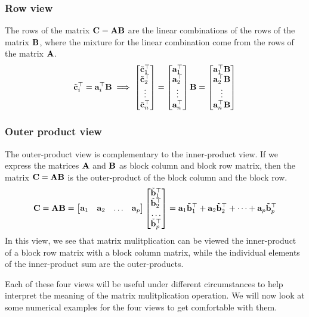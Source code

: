 \subsubsection{Row view}
The rows of the matrix $\mathbf{C} = \mathbf{A}\mathbf{B}$ are the linear combinations of the rows of the matrix $\mathbf{B}$, where the mixture for the linear combination come from the rows of the matrix $\mathbf{A}$.
\begin{equation}
    \tilde{\mf{c}}_i^\top = \mf{a}_i^\top\mf{B} \implies \bmxc \tilde{\mf{c}}_1^\top \\ \tilde{\mf{c}}_2^\top \\ \vdots \\ \tilde{\mf{c}}_n^\top \emx = \bmxc \mf{a}_1^\top \\ \mf{a}_2^\top \\ \vdots \\ \mf{a}_n^\top \emx \mf{B} = \bmxc \mf{a}_1^\top\mf{B} \\ \mf{a}_2^\top\mf{B} \\ \vdots \\ \mf{a}_n^\top\mf{B} \emx
    \label{eq:ch02-mat-mult-row-view}
\end{equation}

\subsubsection{Outer product view}
The outer-product view is complementary to the inner-product view. If we express the matrices $\mathbf{A}$ and $\mathbf{B}$ as block column and block row matrix, then the matrix $\mathbf{C} = \mathbf{A}\mathbf{B}$ is the outer-product of the block column and the block row.
\begin{equation}
    \mf{C} = \mf{A}\mf{B} = \bmxc \mf{a}_1 & \mf{a}_2 & \ldots & \mf{a}_p \emx \bmxc \tilde{\mf{b}}_1^\top \\ \tilde{\mf{b}}_2^\top \\ \ldots \\ \tilde{\mf{b}}_p^\top \emx = \mf{a}_1\tilde{\mf{b}}_1^\top + \mf{a}_2\tilde{\mf{b}}_2^\top + \cdots + \mf{a}_p\tilde{\mf{b}}_p^\top
    \label{eq:ch02-mat-mult-outer-prod}
\end{equation}
In this view, we see that matrix mulitplication can be viewed the inner-product of a block row matrix with a block column matrix, while the individual elements of the inner-product sum are the outer-products.

Each of these four views will be useful under different circumstances to help interpret the meaning of the matrix mulitplication operation. We will now look at some numerical examples for the four views to get comfortable with them.


